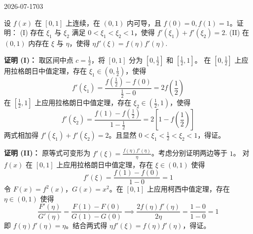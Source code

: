 \begin{mistake}{2026-07-17}{03}

\begin{problemcontent}
设 $f(x)$ 在 $[0,1]$ 上连续，在 $(0,1)$ 内可导，且 $f(0)=0, f(1)=1$。证明：
(I) 存在 $\xi_1$ 与 $\xi_2$ 满足 $0 < \xi_1 < \xi_2 < 1$，使得 $f'(\xi_1) + f'(\xi_2) = 2$.
(II) 在 $(0,1)$ 内存在 $\xi$ 与 $\eta$，使得 $\eta f'(\xi) = f(\eta) f'(\eta)$.
\end{problemcontent}

\begin{solutioncontent}
\textbf{证明 (I)：}
取区间中点 $c = \frac{1}{2}$，将 $[0,1]$ 分为 $[0, \frac{1}{2}]$ 和 $[\frac{1}{2}, 1]$。
在 $[0, \frac{1}{2}]$ 上应用拉格朗日中值定理，存在 $\xi_1 \in (0, \frac{1}{2})$，使得
\[ f'(\xi_1) = \frac{f(\frac{1}{2}) - f(0)}{\frac{1}{2} - 0} = 2f\left(\frac{1}{2}\right) \]
在 $[\frac{1}{2}, 1]$ 上应用拉格朗日中值定理，存在 $\xi_2 \in (\frac{1}{2}, 1)$，使得
\[ f'(\xi_2) = \frac{f(1) - f(\frac{1}{2})}{1 - \frac{1}{2}} = 2\left[1 - f\left(\frac{1}{2}\right)\right] \]
两式相加得 $f'(\xi_1) + f'(\xi_2) = 2$。且显然 $0 < \xi_1 < \frac{1}{2} < \xi_2 < 1$，得证。

\textbf{证明 (II)：}
原等式可变形为 $f'(\xi) = \frac{f(\eta)f'(\eta)}{\eta}$。考虑分别证明两边等于 $1$。
对 $f(x)$ 在 $[0,1]$ 上应用拉格朗日中值定理，存在 $\xi \in (0,1)$ 使得
\[ f'(\xi) = \frac{f(1) - f(0)}{1 - 0} = 1 \]
令 $F(x) = f^2(x)$，$G(x) = x^2$。在 $[0,1]$ 上应用柯西中值定理，存在 $\eta \in (0,1)$ 使得
\[ \frac{F'(\eta)}{G'(\eta)} = \frac{F(1) - F(0)}{G(1) - G(0)} \implies \frac{2f(\eta)f'(\eta)}{2\eta} = \frac{1 - 0}{1 - 0} = 1 \]
即 $f(\eta)f'(\eta) = \eta$。结合两式得 $\eta f'(\xi) = f(\eta)f'(\eta)$，得证。
\end{solutioncontent}


\end{mistake}
